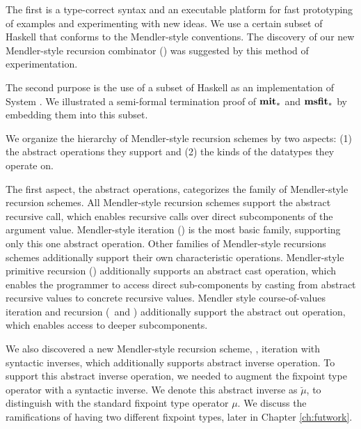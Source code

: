The first is a type-correct syntax and an executable platform for
fast prototyping of examples and experimenting with new ideas. We use
a certain subset of Haskell that conforms to the Mendler-style conventions.
The discovery of our new Mendler-style recursion combinator (\MsfIt)
was suggested by this method of experimentation.

The second purpose is the use of a subset of Haskell as an implementation of
System \Fw. We illustrated a semi-formal termination proof of
$\mathbf{mit}_{*}$ and $\mathbf{msfit}_{*}$ by embedding them into this subset.

We organize the hierarchy of Mendler-style recursion schemes
by two aspects: (1) the abstract operations they support and
(2) the kinds of the datatypes they operate on.

The first aspect, the abstract operations, categorizes the family
of Mendler-style recursion schemes. All Mendler-style recursion schemes
support the abstract recursive call, which enables recursive
calls over direct subcomponents of the argument value.
Mendler-style iteration (\MIt) is the most basic family,
supporting only this one abstract operation. Other
families of Mendler-style recursions schemes additionally support
their own characteristic operations. Mendler-style primitive recursion (\MPr)
additionally supports an abstract cast operation, which enables the programmer
to access direct sub-components by casting from abstract recursive values to
concrete recursive values. Mendler style course-of-values iteration and
recursion (\McvIt\ and \McvPr) additionally support the abstract out
operation, which enables access to deeper subcomponents. 

We also discovered
a new Mendler-style recursion scheme, \MsfIt, iteration with syntactic inverses,
which additionally supports abstract inverse operation. To support
this abstract inverse operation, we needed to augment the fixpoint type operator
with a syntactic inverse. We denote this abstract inverse as $\breve{\mu}$,
to distinguish with the standard fixpoint type operator $\mu$. We discuss
the ramifications of having two different fixpoint types, later in
Chapter \ref{ch:futwork}.

